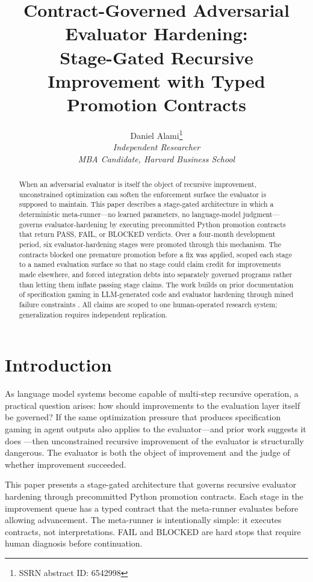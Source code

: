 \documentclass[11pt]{article}
\title{Contract-Governed Adversarial Evaluator Hardening:\\Stage-Gated Recursive Improvement with Typed Promotion Contracts}
\author{Daniel Alami\thanks{SSRN abstract ID: 6542998} \\
\normalsize \textit{Independent Researcher} \\
\normalsize \textit{MBA Candidate, Harvard Business School}}
\date{}
\begin{document}
\maketitle

\begin{abstract}
When an adversarial evaluator is itself the object of recursive improvement, unconstrained optimization can soften the enforcement surface the evaluator is supposed to maintain. This paper describes a stage-gated architecture in which a deterministic meta-runner---no learned parameters, no language-model judgment---governs evaluator-hardening by executing precommitted Python promotion contracts that return PASS, FAIL, or BLOCKED verdicts. Over a four-month development period, six evaluator-hardening stages were promoted through this mechanism. The contracts blocked one premature promotion before a fix was applied, scoped each stage to a named evaluation surface so that no stage could claim credit for improvements made elsewhere, and forced integration debts into separately governed programs rather than letting them inflate passing stage claims. The work builds on prior documentation of specification gaming in LLM-generated code \citep{alami2025a} and evaluator hardening through mined failure constraints \citep{alami2025b}. All claims are scoped to one human-operated research system; generalization requires independent replication.
\end{abstract}


\section{Introduction}

As language model systems become capable of multi-step recursive operation, a practical question arises: how should improvements to the evaluation layer itself be governed? If the same optimization pressure that produces specification gaming in agent outputs \citep{alami2025a} also applies to the evaluator---and prior work suggests it does \citep{alami2025b}---then unconstrained recursive improvement of the evaluator is structurally dangerous. The evaluator is both the object of improvement and the judge of whether improvement succeeded.

This paper presents a stage-gated architecture that governs recursive evaluator hardening through precommitted Python promotion contracts. Each stage in the improvement queue has a typed contract that the meta-runner evaluates before allowing advancement. The meta-runner is intentionally simple: it executes contracts, not interpretations. FAIL and BLOCKED are hard stops that require human diagnosis before continuation.
\end{document}
